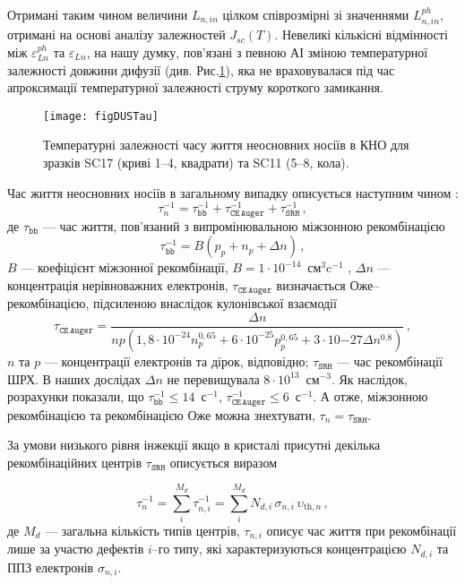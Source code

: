 Отримані таким чином величини $L_{n,in}$ цілком співрозмірні зі значеннями $L_{n,in}^{ph}$, отримані на основі аналізу залежностей $J_{sc}(T)$.
Невеликі кількісні відмінності між $\varepsilon_{L n}^{ph}$ та $\varepsilon_{L n}$,
на нашу думку, пов'язані з певною АІ зміною температурної залежності довжини дифузії (див. Рис.\ref{figDUSTau}),
яка не враховувалася під час апроксимації температурної залежності струму короткого замикання.


\begin{figure}
\center
\texttt{[image: figDUSTau]}%
\caption{\label{figDUSTau}
Температурні залежності часу життя неосновних носіїв в КНО
для зразків SC17 (криві 1--4, квадрати) та SC11 (5--8, кола).
\FigCaptionSSC
}%
\end{figure}

Час життя неосновних носіїв в загальному випадку описується наступним чином \cite{MurphyJAP2011}:
\begin{equation}
\label{eqTAUsum}
\tau_n^{-1}=\tau_\mathtt{bb}^{-1}+\tau_\mathtt{CE\,Auger}^{-1}+\tau_\mathtt{SRH}^{-1}\,,
\end{equation}
де
$\tau_\mathtt{bb}$ --- час життя, пов'язаний з випромінювальною міжзонною рекомбінацією
\begin{equation}
\label{eqTAUbb}
\tau_\mathtt{bb}^{-1}=B(p_p+n_p+\Delta n)\,,
\end{equation}
$B$ --- коефіцієнт міжзонної рекомбінації, $B=1\cdot10^{-14}$~см$^3$c$^{-1}$ \cite{Si:TAUbb,MurphyJAP2011},
$\Delta n$ --- концентрація нерівноважних електронів,
$\tau_\mathtt{CE\,Auger}$ визначається Оже--рекомбінацією, підсиленою внаслідок кулонівської взаємодії  \cite{Si:TAUAuger}
\begin{equation}
\label{eqTAAuger}
\tau_\mathtt{CE\,Auger}=\frac{\Delta n}{np\left(1,8\cdot10^{-24}n_p^{0,65}+6\cdot10^{-25}p_p^{0,65}+3\cdot10{-27}\Delta n^{0.8}\right)}\,,
\end{equation}
$n$ та $p$ --- концентрації електронів та дірок, відповідно;
$\tau_\mathtt{SRH}$ --- час рекомбінації ШРХ.
В наших дослідах $\Delta n$ не перевищувала $8\cdot10^{13}$~см$^{-3}$.
Як наслідок, розрахунки показали, що $\tau_\mathtt{bb}^{-1}\leq14$~с$^{-1}$, $\tau_\mathtt{CE\,Auger}^{-1}\leq6$~с$^{-1}$.
А отже, міжзонною рекомбінацією та рекомбінацією Оже можна знехтувати, $\tau_n=\tau_\mathtt{SRH}$.

За умови низького рівня інжекції якщо в кристалі присутні декілька рекомбінаційних центрів $\tau_\mathtt{SRH}$ описується виразом

\begin{equation}
\label{eqTAUSHRsum}
\tau_n^{-1}=\sum_i^{M_d}\tau_{n,i}^{-1}=\sum_i^{M_d}N_{d,i}\,\sigma_{n,i}\,\upsilon_{\mathrm{th},n}\,,
\end{equation}
де
$M_d$ --- загальна кількість типів центрів,
$\tau_{n,i}$ описує час життя при рекомбінації лише за участю дефектів $i$--го типу,
які характеризуються концентрацією $N_{d,i}$ та ППЗ електронів $\sigma_{n,i}$.

